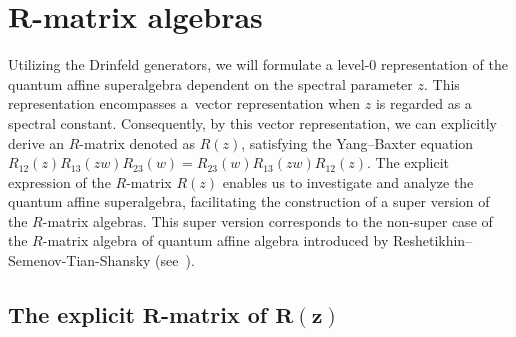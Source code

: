 \documentclass[pdftex]{sigma}
\numberwithin{equation}{section}
\begin{document}
\section[R-matrix algebras]{$\boldsymbol{R}$-matrix algebras}\label{sec4}
Utilizing the Drinfeld generators, we will formulate a level-$0$ representation of the quantum affine superalgebra dependent on the spectral parameter $z$. This representation encompasses a~vector representation when $z$ is regarded as a spectral constant. Consequently,
by this vector representation, we can explicitly derive an $R$-matrix denoted as $R(z)$, satisfying the Yang--Baxter equation
$R_{12}(z)R_{13}(zw)R_{23}(w)=R_{23}(w)R_{13}(zw)R_{12}(z)$. The explicit expression of the $R$-matrix
$R(z)$ enables us to investigate and analyze the quantum affine superalgebra, facilitating the construction of a super version of the $R$-matrix algebras. This super version corresponds to the non-super case of the $R$-matrix algebra of quantum affine algebra introduced by Reshetikhin--Semenov-Tian-Shansky (see~\cite{RS}).

\subsection[The explicit R-matrix of R(z)]{The explicit $\boldsymbol{R}$-matrix of $\boldsymbol{R(z)}$ }\label{sec4.1}
\end{document}
